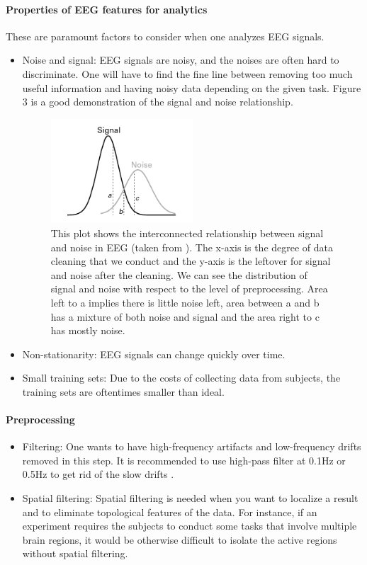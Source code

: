 \documentclass[a4paper,11pt,oneside]{article}
\begin{document}
\paragraph{Properties of EEG features for analytics} 
These are paramount factors to consider when one analyzes EEG signals.
\begin{itemize}
	\item Noise and signal: EEG signals are noisy, and the noises are often hard to discriminate. One will have to find the fine line between removing too much useful information and having noisy data depending on the given task. Figure 3 is a good demonstration of the signal and noise relationship.
	\begin{figure}[h]
		\centering
		\includegraphics[width=0.5\textwidth]{img/noise}
		\caption{This plot shows the interconnected relationship between signal and noise in EEG (taken from \cite{cohen2014analyzing}). The x-axis is the degree of data cleaning that we conduct and the y-axis is the leftover for signal and noise after the cleaning. We can see the distribution of signal and noise with respect to the level of preprocessing. Area left to a implies there is little noise left, area between a and b has a mixture of both noise and signal and the area right to c has mostly noise.}
	\end{figure}
	\item Non-stationarity: EEG signals can change quickly over time.
	\item Small training sets: Due to the costs of collecting data from subjects, the training sets are oftentimes 
	smaller than ideal.
\end{itemize}

\paragraph{Preprocessing}
\begin{itemize}
	\item Filtering: One wants to have high-frequency artifacts and low-frequency drifts removed in this step.
	It is recommended to use high-pass filter at 0.1Hz or 0.5Hz to get rid of the slow drifts \cite{cohen2014analyzing}.
	\item Spatial filtering: Spatial filtering is needed when you want to localize a result and to eliminate topological features of the data. For instance, if an experiment requires the subjects to conduct some tasks that involve multiple brain regions, it would be otherwise difficult to isolate the active regions without spatial filtering. \cite{cohen2014analyzing}
\end{itemize}
\end{document}
